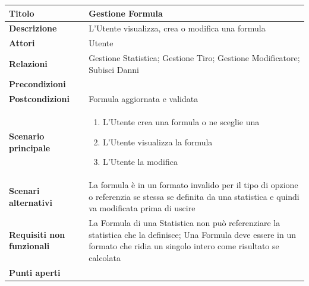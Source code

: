\documentclass[a4paper, 11pt]{article}
\begin{document}
\begin{center}
\vspace{3em}

\begin{tabular}{ |p{5cm}|p{9.5cm}|  }
\hline
\textbf{Titolo} & Gestione Formula \\
\hline
\textbf{Descrizione} & L'Utente visualizza, crea o modifica una formula \\
\hline
\textbf{Attori} & Utente  \\
\hline
\textbf{Relazioni} & Gestione Statistica; Gestione Tiro; Gestione Modificatore; Subisci Danni \\
\hline
\textbf{Precondizioni} &  \\
\hline
\textbf{Postcondizioni} & Formula aggiornata e validata \\
\hline
\textbf{Scenario principale} & 
\begin{enumerate}
    \item L'Utente crea una formula o ne sceglie una
    \item L'Utente visualizza la formula
    \item L'Utente la modifica
\end{enumerate}
\\
\hline
\textbf{Scenari alternativi} &La formula è in un formato invalido per il tipo di opzione o referenzia se stessa se definita da una statistica e quindi va modificata prima di uscire \\
\hline
    \textbf{Requisiti non funzionali} & La Formula di una Statistica non può referenziare la statistica che la definisce; Una Formula deve essere in un formato che ridia un singolo intero come risultato se calcolata \\
\hline
\textbf{Punti aperti} &  \\
\hline
\end{tabular}

\vspace{3em}


\end{center}
\end{document}
